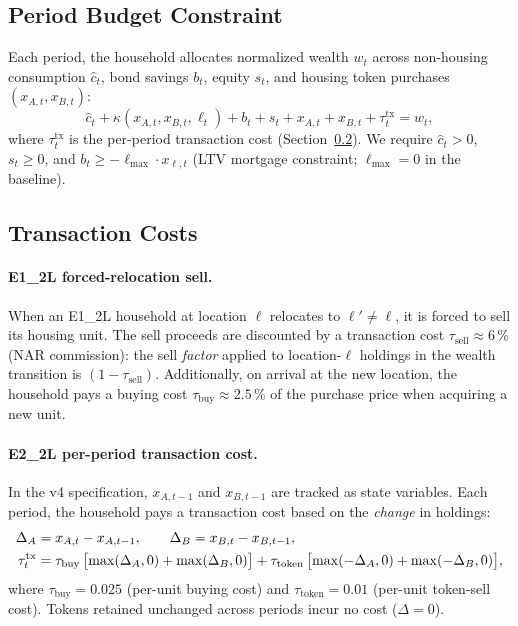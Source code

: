 \subsection{Period Budget Constraint}
\label{sec:model:budget}

Each period, the household allocates normalized wealth $w_t$ across
non-housing consumption $\hat{c}_t$, bond savings $b_t$, equity $s_t$,
and housing token purchases $(x_{A,t}, x_{B,t})$:
\begin{equation}
    \hat{c}_t + \kappa(x_{A,t}, x_{B,t}, \ell_t)
    + b_t + s_t + x_{A,t} + x_{B,t} + \tau_t^{\text{tx}} = w_t,
    \label{eq:budget}
\end{equation}
where $\tau_t^{\text{tx}}$ is the per-period transaction cost
(Section~\ref{sec:model:txcost}).  We require $\hat{c}_t > 0$,
$s_t \geq 0$, and $b_t \geq -\ell_{\max} \cdot x_{\ell,t}$ (LTV
mortgage constraint; $\ell_{\max} = 0$ in the baseline).

\subsection{Transaction Costs}
\label{sec:model:txcost}

\paragraph{E1\_2L forced-relocation sell.}
When an E1\_2L household at location $\ell$ relocates to $\ell' \neq \ell$,
it is forced to sell its housing unit.  The sell proceeds are discounted by
a transaction cost $\tau_{\text{sell}} \approx 6\,\%$ (NAR commission):
the sell \emph{factor} applied to location-$\ell$ holdings in the wealth
transition is $(1 - \tau_{\text{sell}})$.
Additionally, on arrival at the new location, the household pays a buying
cost $\tau_{\text{buy}} \approx 2.5\,\%$ of the purchase price when
acquiring a new unit.

\paragraph{E2\_2L per-period transaction cost.}
In the v4 specification, $x_{A,t-1}$ and $x_{B,t-1}$ are tracked as state
variables.  Each period, the household pays a transaction cost based on the
\emph{change} in holdings:
\begin{align}
    \Delta_A &= x_{A,t} - x_{A,t-1}, \qquad
    \Delta_B = x_{B,t} - x_{B,t-1}, \notag \\
    \tau_t^{\text{tx}} &= \tau_{\text{buy}} \,
        \bigl[\max(\Delta_A, 0) + \max(\Delta_B, 0)\bigr]
        + \tau_{\text{token}} \,
        \bigl[\max(-\Delta_A, 0) + \max(-\Delta_B, 0)\bigr],
    \label{eq:txcost}
\end{align}
where $\tau_{\text{buy}} = 0.025$ (per-unit buying cost) and
$\tau_{\text{token}} = 0.01$ (per-unit token-sell cost).
Tokens retained unchanged across periods incur no cost ($\Delta = 0$).

